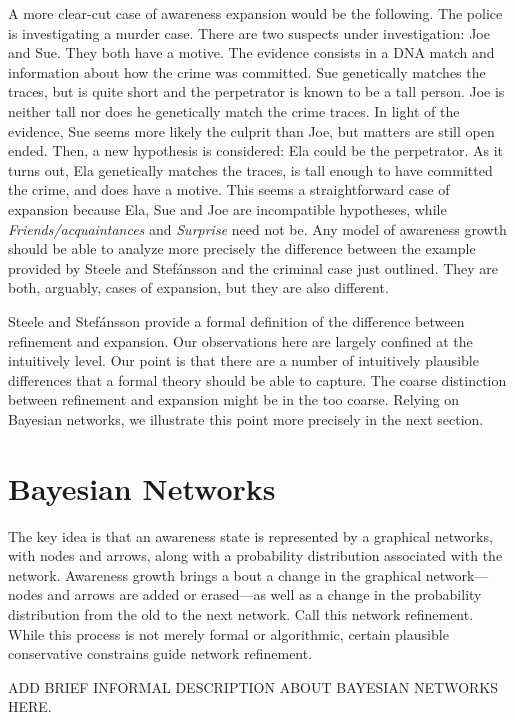 \documentclass[
  11pt,
  dvipsnames,enabledeprecatedfontcommands]{scrartcl}
\begin{document}
A more clear-cut case of awareness expansion would be the following. The
police is investigating a murder case. There are two suspects under
investigation: Joe and Sue. They both have a motive. The evidence
consists in a DNA match and information about how the crime was
committed. Sue genetically matches the traces, but is quite short and
the perpetrator is known to be a tall person. Joe is neither tall nor
does he genetically match the crime traces. In light of the evidence,
Sue seems more likely the culprit than Joe, but matters are still open
ended. Then, a new hypothesis is considered: Ela could be the
perpetrator. As it turns out, Ela genetically matches the traces, is
tall enough to have committed the crime, and does have a motive. This
seems a straightforward case of expansion because Ela, Sue and Joe are
incompatible hypotheses, while \textit{Friends/acquaintances} and
\textit{Surprise} need not be. Any model of awareness growth should be
able to analyze more precisely the difference between the example
provided by Steele and Stefánsson and the criminal case just outlined.
They are both, arguably, cases of expansion, but they are also
different.

Steele and Stefánsson provide a formal definition of the difference
between refinement and expansion. Our observations here are largely
confined at the intuitively level. Our point is that there are a number
of intuitively plausible differences that a formal theory should be able
to capture. The coarse distinction between refinement and expansion
might be in the too coarse. Relying on Bayesian networks, we illustrate
this point more precisely in the next section.

\hypertarget{bayesian-networks}{%
\section{Bayesian Networks}\label{bayesian-networks}}

The key idea is that an awareness state is represented by a graphical
networks, with nodes and arrows, along with a probability distribution
associated with the network. Awareness growth brings a bout a change in
the graphical network---nodes and arrows are added or erased---as well
as a change in the probability distribution from the old to the next
network. Call this network refinement. While this process is not merely
formal or algorithmic, certain plausible conservative constrains guide
network refinement.

ADD BRIEF INFORMAL DESCRIPTION ABOUT BAYESIAN NETWORKS HERE.
\end{document}
